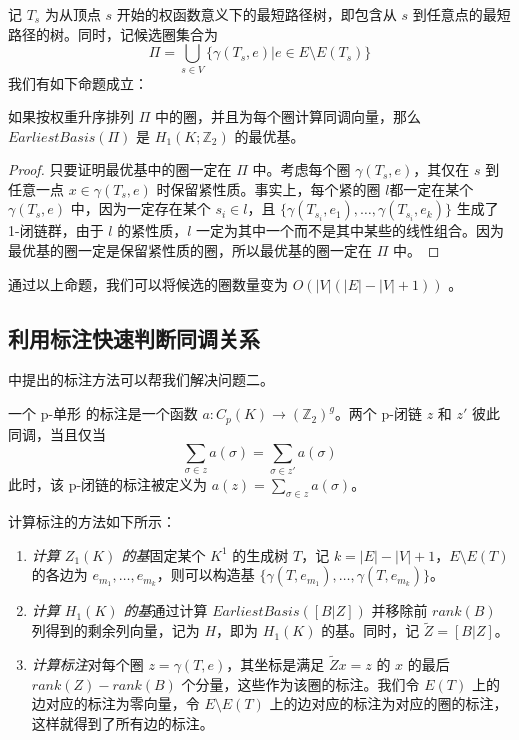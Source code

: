 记 $ T_s $ 为从顶点 $ s $ 开始的权函数意义下的最短路径树，即包含从 $ s $ 到任意点的最短路径的树。同时，记候选圈集合为
$$
\Pi = \bigcup_{s \in V} \{ \gamma(T_s, e) | e \in E \setminus E(T_s) \}
$$
我们有如下命题成立\cite{Busaryev2012}：
\begin{proposition}
    如果按权重升序排列 $ \Pi $ 中的圈，并且为每个圈计算同调向量，那么 $ EarliestBasis(\Pi) $ 是 $ H_1(K; \mathbb{Z}_2) $ 的最优基。
\end{proposition}
\begin{proof}
    只要证明最优基中的圈一定在 $ \Pi $ 中。考虑每个圈 $ \gamma(T_s, e) $，其仅在 $ s $ 到任意一点 $ x \in \gamma(T_s, e) $ 时保留紧性质。事实上，每个紧的圈 $ l $都一定在某个 $ \gamma(T_s, e) $ 中，因为一定存在某个 $ s_i \in l $，且 $ \{\gamma(T_{s_i}, e_1), \dots, \gamma(T_{s_i}, e_{k})\} $ 生成了 1-闭链群，由于 $ l $ 的紧性质，$ l $ 一定为其中一个而不是其中某些的线性组合。因为最优基的圈一定是保留紧性质的圈，所以最优基的圈一定在 $ \Pi $ 中。
\end{proof}

通过以上命题，我们可以将候选的圈数量变为 $ O(|V|(|E|-|V|+1)) $ 。

\subsection{利用标注快速判断同调关系}
\label{subsec:annotation}

\citet{Busaryev2012} 中提出的标注方法可以帮我们解决问题二。

\begin{definition}
    一个 p-单形 的标注是一个函数 $ a: C_p(K) \to (\mathbb{Z}_2)^{g} $。两个 p-闭链 $ z $ 和 $ z' $ 彼此同调，当且仅当
    \begin{equation*}
        \sum_{\sigma \in z} a(\sigma) = \sum_{\sigma \in z'} a(\sigma)
    \end{equation*}
    此时，该 p-闭链的标注被定义为 $ a(z) = \sum_{\sigma \in z} a(\sigma) $。
\end{definition}

计算标注的方法如下所示：
\begin{enumerate}
    \item \emph{计算 $ Z_1(K) $ 的基}\quad 固定某个 $ K^1 $ 的生成树 $ T $，记 $ k = |E| - |V| + 1 $，$ E \setminus E(T) $ 的各边为 $ e_{m_1}, \dots, e_{m_k} $，则可以构造基 $ \{ \gamma(T, e_{m_1}), \dots, \gamma(T, e_{m_{k}}) \} $。
    \item \emph{计算 $ H_1(K) $ 的基}\quad 通过计算 $ EarliestBasis([B | Z]) $ 并移除前 $ rank(B) $ 列得到的剩余列向量，记为 $ H $，即为 $ H_1(K) $ 的基。同时，记 $ \tilde{Z} = [B | Z] $。
    \item \emph{计算标注}\quad 对每个圈 $ z = \gamma(T, e) $，其坐标是满足 $ \tilde{Z} x = z $ 的 $ x $ 的最后 $ rank(Z) - rank(B) $ 个分量，这些作为该圈的标注。我们令 $ E(T) $ 上的边对应的标注为零向量，令 $ E \setminus E(T) $ 上的边对应的标注为对应的圈的标注，这样就得到了所有边的标注。
\end{enumerate}

